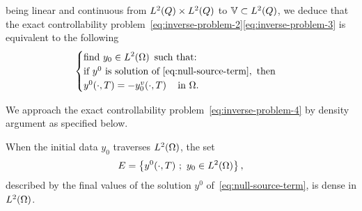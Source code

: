 \begin{remarque}
\begin{equation*}
    \end{equation*}
    being linear and continuous from $L^{2}\!\left({Q}\right)\times L^{2}\!\left({Q}\right)$ to
    $\mathbb{V}\subset L^{2}\!\left({Q}\right)$, we deduce that the exact controllability
    problem~\eqref{eq:inverse-problem-2}\eqref{eq:inverse-problem-3} is
    equivalent to the following
    \begin{equation}\label{eq:inverse-problem-4}
        \begin{cases}\displaystyle
            \text{find}\ y_{0}\in L^{2}\!\left({\Omega}\right)\ \text{such that:}\\
            \text{if}\ y^{0}\ \text{is solution
            of}~\eqref{eq:null-source-term},\ \text{then}\\
            y^{0}\!\left({\cdot,T}\right) = -y_{0}^{v}\!\left({\cdot,
            T}\right)\quad \text{in}\ \Omega.
        \end{cases}
    \end{equation}
\end{remarque}


We approach the exact controllability problem~\eqref{eq:inverse-problem-4}
by density argument as specified below.

\begin{proposition}\label{propo:controllability-result-1}%
    When the initial data $y_{0}$ traverses $L^{2}\!\left({\Omega}\right)$, the set
    \begin{equation*}\label{eq:controllability-result-1}
        E = \left\{{%
            y^{0}\!\left({\cdot,T}\right)\,;\ y_{0}\in\Ldeux{\Omega}
        }\right\},
    \end{equation*}
    described by the final values of the solution $y^{0}$
    of~\eqref{eq:null-source-term}, is dense in $L^{2}\!\left({\Omega}\right)$.
\end{proposition}

